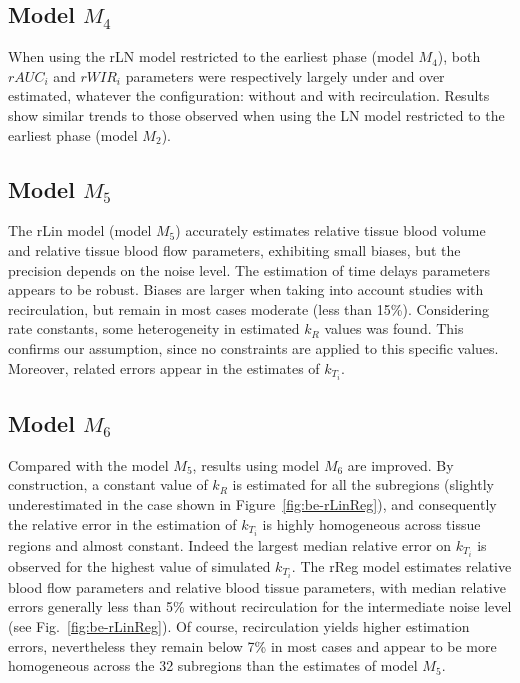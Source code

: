 \subsection{Model $M_4$}
When using the rLN model restricted to the earliest phase (model $M_4$), both $rAUC_i$ and $rWIR_i$ parameters were respectively largely under and over estimated, whatever the configuration: without and with recirculation. Results show similar trends to those observed when using the LN model restricted to the earliest phase (model $M_2$).

\subsection{Model $M_5$}
The rLin model (model $M_5$) accurately estimates relative tissue blood volume and relative tissue blood flow parameters, exhibiting small biases, but the precision depends on the noise level. The estimation of time delays parameters appears to be robust. Biases are larger when taking into account studies with recirculation, but remain in most cases moderate (less than 15\%). Considering rate constants, some heterogeneity in estimated $k_R$ values was found. This confirms our assumption, since no constraints are applied to this specific values. Moreover, related errors appear in the estimates of $k_{T_i}$.

\subsection{Model $M_6$}
Compared with the model $M_5$, results using model $M_6$ are improved. By construction, a constant value of $k_R$ is estimated for all the subregions (slightly underestimated in the case shown in Figure~\ref{fig:be-rLinReg}), and consequently the relative error in the estimation of $k_{T_i}$ is highly homogeneous across tissue regions and almost constant. Indeed the largest median relative error on $k_{T_i}$ is observed for the highest value of simulated $k_{T_i}$. The rReg model estimates relative blood flow parameters and relative blood tissue parameters, with median relative errors generally less than 5\% without recirculation for the intermediate noise level (see Fig.~\ref{fig:be-rLinReg}). Of course, recirculation yields higher estimation errors, nevertheless they remain below 7\% in most cases and appear to be more homogeneous across the 32 subregions than the estimates of model $M_5$. 

